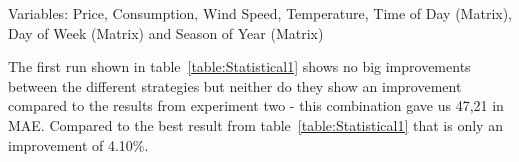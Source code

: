 Variables: Price, Consumption, Wind Speed, Temperature, Time of Day (Matrix), Day of Week (Matrix) and Season of Year (Matrix)
\begin{table}[H]
\centering  %
\caption{Statistical results} %
\label{table:Statistical1} %
\end{table}

The first run shown in table~\ref{table:Statistical1} shows no big improvements between the different strategies but neither do they show an improvement compared to the results from experiment two - this combination gave us 47,21 in MAE. Compared to the best result from table~\ref{table:Statistical1} that is only an improvement of 4.10\%.

